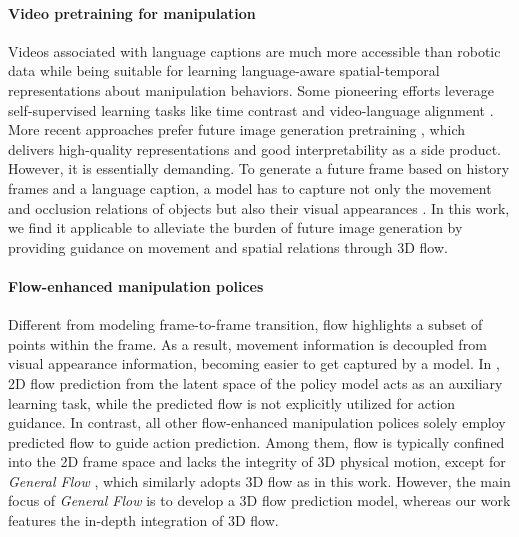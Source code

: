 \paragraph{Video pretraining for manipulation}
Videos associated with language captions are much more accessible than robotic data while being suitable for learning language-aware spatial-temporal representations about manipulation behaviors. Some pioneering efforts leverage self-supervised learning tasks like time contrast \cite{nair2023r3m,mavip} and video-language alignment \cite{pmlr-v164-jang22a,karamcheti2023voltron}. More recent approaches prefer future image generation pretraining \cite{wuunleashing, zeng2024learning, yang2024spatiotemporal, he2024large}, which delivers high-quality representations and good interpretability as a side product. However, it is essentially demanding. To generate a future frame based on history frames and a language caption, a model has to capture not only the movement and occlusion relations of objects but also their visual appearances \cite{wen2023any}. In this work, we find it applicable to alleviate the burden of future image generation by providing guidance on movement and spatial relations through 3D flow.

\paragraph{Flow-enhanced manipulation polices}
Different from modeling frame-to-frame transition, flow highlights a subset of points within the frame. As a result, movement information is decoupled from visual appearance information, becoming easier to get captured by a model. In \cite{bharadhwaj2024gen2act}, 2D flow prediction from the latent space of the policy model acts as an auxiliary learning task, while the predicted flow is not explicitly utilized for action guidance. In contrast, all other flow-enhanced manipulation polices \cite{vecerik2024robotap, wen2023any, bharadhwaj2024track2act, xuflow} solely employ predicted flow to guide action prediction. Among them, flow is typically confined into the 2D frame space and lacks the integrity of 3D physical motion, except for \emph{General Flow} \cite{xuflow}, which similarly adopts 3D flow as in this work. However, the main focus of \emph{General Flow} \cite{xuflow} is to develop a 3D flow prediction model, whereas our work features the in-depth integration of 3D flow.